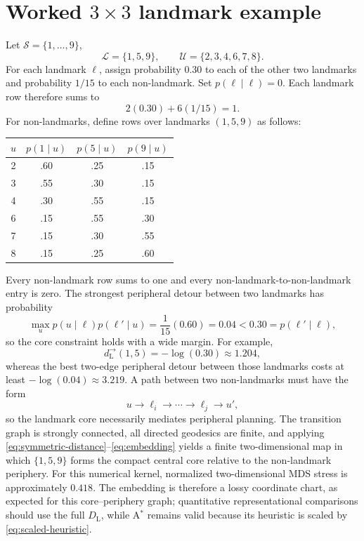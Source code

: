 \documentclass[11pt]{article}
\begin{document}
\section{Worked \texorpdfstring{$3\times3$}{3 by 3} landmark example}
\label{sec:example}

Let $\mathcal S=\{1,\ldots,9\}$,
\[
\mathcal L=\{1,5,9\},
\qquad
\mathcal U=\{2,3,4,6,7,8\}.
\]
For each landmark $\ell$, assign probability $0.30$ to each of the other two landmarks
and probability $1/15$ to each non-landmark. Set $p(\ell\mid\ell)=0$. Each landmark row
therefore sums to
\[
2(0.30)+6(1/15)=1.
\]
For non-landmarks, define rows over landmarks $(1,5,9)$ as follows:
\begin{center}
\begin{tabular}{c@{\qquad}ccc}
\toprule
$u$ & $p(1\mid u)$ & $p(5\mid u)$ & $p(9\mid u)$\\
\midrule
2 & .60 & .25 & .15\\
3 & .55 & .30 & .15\\
4 & .30 & .55 & .15\\
6 & .15 & .55 & .30\\
7 & .15 & .30 & .55\\
8 & .15 & .25 & .60\\
\bottomrule
\end{tabular}
\end{center}
Every non-landmark row sums to one and every non-landmark-to-non-landmark entry is zero.
The strongest peripheral detour between two landmarks has probability
\[
\max_u p(u\mid\ell)p(\ell'\mid u)
=
\frac{1}{15}(0.60)
=
0.04
<
0.30
=
p(\ell'\mid\ell),
\]
so the core constraint holds with a wide margin. For example,
\[
d_{\mathrm L}^\to(1,5)=-\log(0.30)\approx1.204,
\]
whereas the best two-edge peripheral detour between those landmarks costs at least
$-\log(0.04)\approx3.219$. A path between two non-landmarks must have the form
\[
u
\longrightarrow
\ell_i
\longrightarrow\cdots\longrightarrow
\ell_j
\longrightarrow
u',
\]
so the landmark core necessarily mediates peripheral planning. The transition graph is
strongly connected, all directed geodesics are finite, and applying
\eqref{eq:symmetric-distance}--\eqref{eq:embedding} yields a finite two-dimensional map in
which $\{1,5,9\}$ forms the compact central core relative to the non-landmark periphery.
For this numerical kernel, normalized two-dimensional MDS stress is approximately $0.418$.
The embedding is therefore a lossy coordinate chart, as expected for this core--periphery
graph; quantitative representational comparisons should use the full $D_{\mathrm L}$,
while A$^\ast$ remains valid because its heuristic is scaled by
\eqref{eq:scaled-heuristic}.
\end{document}
